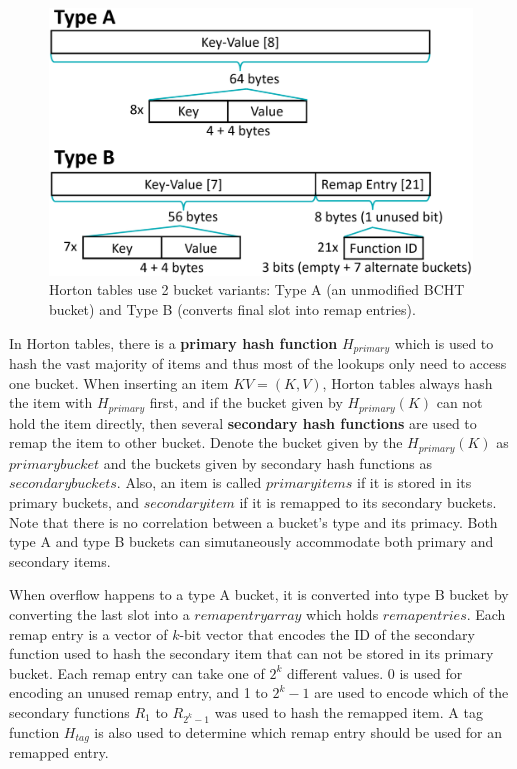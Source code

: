 \documentclass[12pt,conference,compsoc]{IEEEtran}
\begin{document}
\begin{figure}
    \centering
    \includegraphics[width=\linewidth]{2-type-buckets.png}
    \caption{Horton tables use 2 bucket variants: Type A (an unmodified BCHT bucket) and Type B (converts final slot into remap entries).} \label{fig:bucket-type}
\end{figure}

In Horton tables, there is a \textbf{primary hash function} $H_{primary}$ which is used to hash the vast majority of items and thus most of the lookups only need to access one bucket. When inserting an item $KV=(K,V)$, Horton tables always hash the item with $H_{primary}$ first, and if the bucket given by $H_{primary}(K)$ can not hold the item directly, then several \textbf{secondary hash functions} are used to remap the item to other bucket. Denote the bucket given by the $H_{primary}(K)$ as $primary bucket$ and the buckets given by secondary hash functions as $secondary buckets$. Also, an item is called $primary items$ if it is stored in its primary buckets, and $secondary item$ if it is remapped to its secondary buckets. Note that there is no correlation between a bucket's type and its primacy. Both type A and type B buckets can simutaneously accommodate both primary and secondary items.

When overflow happens to a type A bucket, it is converted into type B bucket by converting the last slot into a $remap entry array$ which holds $remap entries$. Each remap entry is a vector of $k$-bit vector that encodes the ID of the secondary function used to hash the secondary item that can not be stored in its primary bucket. Each remap entry can take one of $2^k$ different values. 0 is used for encoding an unused remap entry, and 1 to $2^k-1$ are used to encode which of the secondary functions $R_1$ to $R_{2^k-1}$ was used to hash the remapped item. A tag function $H_{tag}$ is also used to determine which remap entry should be used for an remapped entry.
\end{document}
